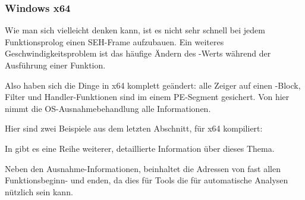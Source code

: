 \subsubsection{Windows x64}

\label{SEH_win64}

Wie man sich vielleicht denken kann, ist es nicht sehr schnell bei jedem Funktionsprolog
einen SEH-Frame aufzubauen.
Ein weiteres Geschwindigkeitsproblem ist das häufige Ändern des -Werts
während der Ausführung einer Funktion.

Also haben sich die Dinge in x64 komplett geändert: alle Zeiger auf einen -Block,
Filter und Handler-Funktionen sind im einem PE-Segment  gesichert.
Von hier nimmt die \ac{OS}-Ausnahmebehandlung alle Informationen.

Hier sind zwei Beispiele aus dem letzten Abschnitt, für x64 kompiliert:





In \IgorSkochinsky gibt es eine Reihe weiterer, detaillierte Information über dieses Thema.

Neben den Ausnahme-Informationen, beinhaltet  die Adressen von fast allen
Funktionsbeginn- und enden, da dies für Tools die für automatische Analysen nützlich
sein kann.
